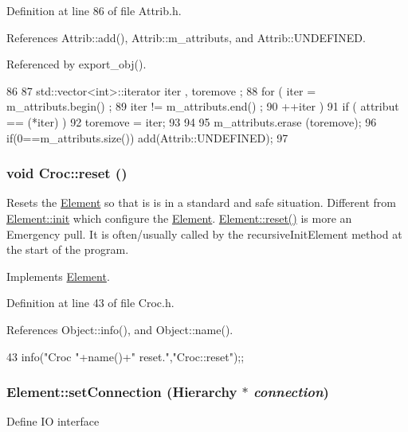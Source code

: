Definition at line 86 of file Attrib.h.

References Attrib::add(), Attrib::m\_\-attributs, and Attrib::UNDEFINED.

Referenced by export\_\-obj().


\begin{DoxyCode}
86                                {
87     std::vector<int>::iterator iter , toremove ;
88     for ( iter  = m_attributs.begin() ;
89           iter != m_attributs.end()   ;
90           ++iter ) {
91       if ( attribut == (*iter) ) {
92         toremove = iter;
93       }
94     }
95     m_attributs.erase (toremove);
96     if(0==m_attributs.size()) add(Attrib::UNDEFINED);
97   }
\end{DoxyCode}
\hypertarget{classCroc_aa95453776f49e4affe375500e96eb906}{
\subsubsection[{reset}]{\setlength{\rightskip}{0pt plus 5cm}void Croc::reset ()}}
\label{classCroc_aa95453776f49e4affe375500e96eb906}
Resets the \hyperlink{classElement}{Element} so that is is in a standard and safe situation. Different from \hyperlink{classElement_af42754b5cabc198869222725218d695c}{Element::init} which configure the \hyperlink{classElement}{Element}. \hyperlink{classElement_a69efffa22f06909d768149715565cb56}{Element::reset()} is more an Emergency pull. It is often/usually called by the recursiveInitElement method at the start of the program. 

Implements \hyperlink{classElement_a69efffa22f06909d768149715565cb56}{Element}.

Definition at line 43 of file Croc.h.

References Object::info(), and Object::name().


\begin{DoxyCode}
43 { info("Croc "+name()+" reset.","Croc::reset");};
\end{DoxyCode}
\hypertarget{classElement_ab476b4b1df5954141ceb14f072433b89}{
\subsubsection[{setConnection}]{ Element::setConnection ({\bf Hierarchy} $\ast$ {\em connection})}}
\label{classElement_ab476b4b1df5954141ceb14f072433b89}
Define IO interface 

